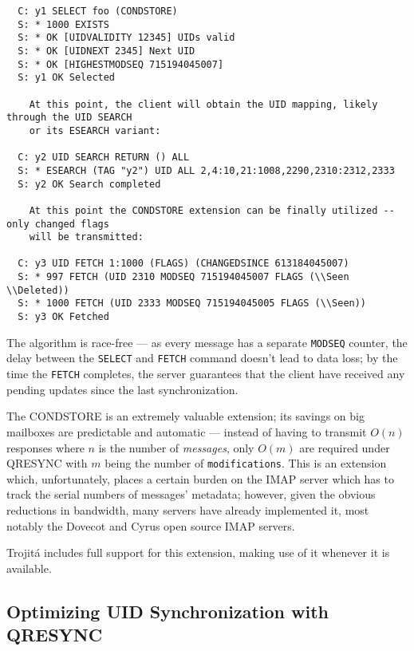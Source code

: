 \documentclass[trojita]{subfiles}
\begin{document}
\begin{verbatim}
  C: y1 SELECT foo (CONDSTORE)
  S: * 1000 EXISTS
  S: * OK [UIDVALIDITY 12345] UIDs valid
  S: * OK [UIDNEXT 2345] Next UID
  S: * OK [HIGHESTMODSEQ 715194045007]
  S: y1 OK Selected

    At this point, the client will obtain the UID mapping, likely through the UID SEARCH
    or its ESEARCH variant:

  C: y2 UID SEARCH RETURN () ALL
  S: * ESEARCH (TAG "y2") UID ALL 2,4:10,21:1008,2290,2310:2312,2333
  S: y2 OK Search completed

    At this point the CONDSTORE extension can be finally utilized -- only changed flags
    will be transmitted:

  C: y3 UID FETCH 1:1000 (FLAGS) (CHANGEDSINCE 613184045007)
  S: * 997 FETCH (UID 2310 MODSEQ 715194045007 FLAGS (\\Seen \\Deleted))
  S: * 1000 FETCH (UID 2333 MODSEQ 715194045005 FLAGS (\\Seen))
  S: y3 OK Fetched
\end{verbatim}

The algorithm is race-free --- as every message has a separate {\tt MODSEQ} counter, the delay between the {\tt SELECT}
and {\tt FETCH} command doesn't lead to data loss; by the time the {\tt FETCH} completes, the server guarantees that the
client have received any pending updates since the last synchronization.

The CONDSTORE is an extremely valuable extension; its savings on big mailboxes are predictable and automatic --- instead
of having to transmit $O(n)$ responses where $n$ is the number of {\em messages}, only $O(m)$ are required under QRESYNC
with $m$ being the number of {\tt modifications}.  This is an extension which, unfortunately, places a certain burden on
the IMAP server which has to track the serial numbers of messages' metadata; however, given the obvious reductions in
bandwidth, many servers have already implemented it, most notably the Dovecot and Cyrus open source IMAP servers.

\begin{trojitabehavior}
Trojitá includes full support for this extension, making use of it whenever it is available.
\end{trojitabehavior}

\subsection{Optimizing UID Synchronization with QRESYNC}
\label{sec:extension-qresync}
\end{document}
